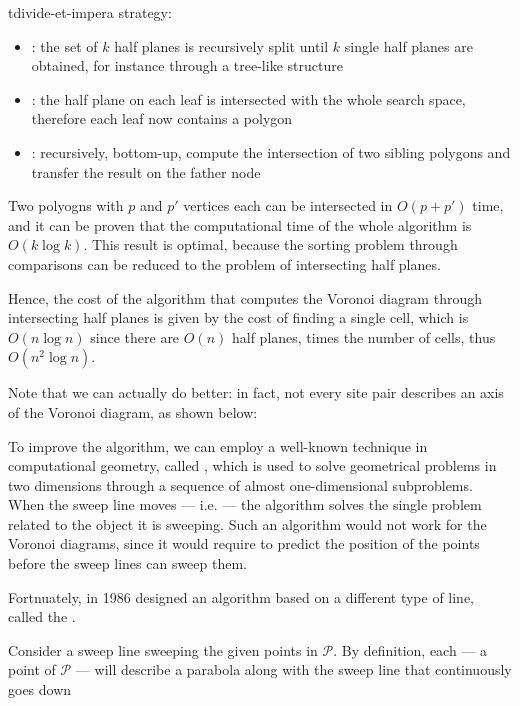 \documentclass[a4paper, 12pt]{report}
\begin{document}
t{divide-et-impera} strategy:

    \begin{itemize}
        \item {}: the set of $k$ half planes is recursively split until $k$ single half planes are obtained, for instance through a tree-like structure
        \item {}: the half plane on each leaf is intersected with the whole search space, therefore each leaf now contains a polygon
        \item {}: recursively, bottom-up, compute the intersection of two sibling polygons and transfer the result on the father node
    \end{itemize}

    Two polyogns with $p$ and $p'$ vertices each can be intersected in $O(p + p')$ time, and it can be proven that the computational time of the whole algorithm is $O(k \log k)$. This result is optimal, because the sorting problem through comparisons can be reduced to the problem of intersecting half planes.

    Hence, the cost of the algorithm that computes the Voronoi diagram through intersecting half planes is given by the cost of finding a single cell, which is $O(n \log n)$ since there are $O(n)$ half planes, times the number of cells, thus $O(n^2 \log n)$.

    Note that we can actually do better: in fact, not every site pair describes an axis of the Voronoi diagram, as shown below:


    To improve the algorithm, we can employ a well-known technique in computational geometry, called , which is used to solve geometrical problems in two dimensions through a sequence of almost one-dimensional subproblems. When the sweep line moves --- i.e.  --- the algorithm solves the single problem related to the object it is sweeping. Such an algorithm would not work for the Voronoi diagrams, since it would require to predict the position of the points before the sweep lines can sweep them.

    Fortnuately, in 1986 \textcite{fortune} designed an algorithm based on a different type of line, called the .

    Consider a sweep line sweeping the given points in $\mathcal P$. By definition, each  --- a point of $\mathcal P$ ---  will describe a parabola along with the sweep line that continuously goes down
\end{document}
